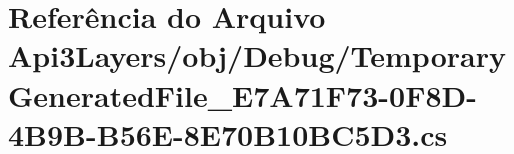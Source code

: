 \hypertarget{Api3Layers_2obj_2Debug_2TemporaryGeneratedFile__E7A71F73-0F8D-4B9B-B56E-8E70B10BC5D3_8cs}{}\section{Referência do Arquivo Api3\+Layers/obj/\+Debug/\+Temporary\+Generated\+File\+\_\+\+E7\+A71\+F73-\/0\+F8\+D-\/4\+B9\+B-\/\+B56\+E-\/8\+E70\+B10\+B\+C5\+D3.cs}
\label{Api3Layers_2obj_2Debug_2TemporaryGeneratedFile__E7A71F73-0F8D-4B9B-B56E-8E70B10BC5D3_8cs}
